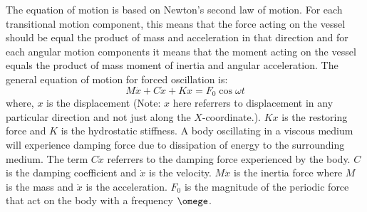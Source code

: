 The equation of motion is based on Newton's second law of motion. For each
transitional motion component, this means that the force acting on the vessel
should be equal the product of mass and acceleration in that direction and for
each angular motion components it means that the moment acting on the vessel
equals the product of mass moment of inertia and angular acceleration. The
general equation of motion for forced oscillation is:
\begin{equation}
  M\ddot{x} + C\dot{x} + Kx = F_0 \cos{\omega t}
  \label{eq: equation of motion}
\end{equation}
where, $x$ is the displacement (Note: $x$ here referrers to displacement in any
particular direction and not just along the $X$-coordinate.). $Kx$ is the
restoring force and $K$ is the hydrostatic stiffness. A body oscillating in a
viscous medium will experience damping force due to dissipation of energy to the
surrounding medium. The term $C\dot{x}$ referrers to the damping force
experienced by the body. $C$ is the damping coefficient and $\dot{x}$ is the
velocity. $M\ddot{x}$ is the inertia force where $M$ is the mass and $\ddot{x}$
is the acceleration. $F_0$ is the magnitude of the periodic force that act on
the body with a frequency $\omege$.

